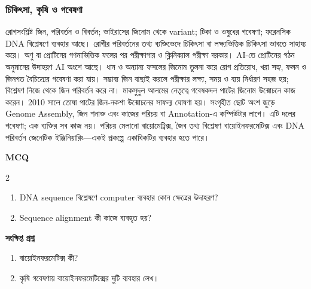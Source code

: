\subsubsection{চিকিৎসা, কৃষি ও গবেষণা}
রোগসংশ্লিষ্ট জিন, পরিবর্তন ও বিবর্তন; ভাইরাসের জিনোম থেকে variant; টিকা ও ওষুধের গবেষণা; ফরেনসিক DNA বিশ্লেষণে ব্যবহার আছে। রোগীর পরিবর্তনের তথ্য ব্যক্তিভেদে চিকিৎসা বা লক্ষ্যভিত্তিক চিকিৎসা ভাবতে সাহায্য করে। অণু বা প্রোটিনের গণনাভিত্তিক ফলের পর পরীক্ষাগার ও ক্লিনিক্যাল পরীক্ষা দরকার। AI-তে প্রোটিনের গঠন অনুমানের উদাহরণ AI অংশে আছে।
ধান ও অন্যান্য ফসলের জিনোম তুলনা করে রোগ প্রতিরোধ, খরা সহ্য, ফলন ও জিনগত বৈচিত্র্যের গবেষণা করা যায়। সম্ভাব্য জিন বাছাই করলে পরীক্ষার লক্ষ্য, সময় ও ব্যয় নির্ধারণ সহজ হয়; বিশ্লেষণ নিজে থেকে জিন পরিবর্তন করে না।
মাকসুদুল আলমের নেতৃত্বে গবেষকদল পাটের জিনোম উন্মোচনে কাজ করেন। 2010 সালে তোষা পাটের জিন-নকশা উন্মোচনের সাফল্য ঘোষণা হয়। সংগৃহীত ছোট অংশ জুড়ে Genome Assembly, জিন শনাক্ত এবং কাজের পরিচয় বা Annotation-এ কম্পিউটার লাগে। এটি দলের গবেষণা; এক ব্যক্তির সব কাজ নয়। পরিচয় মেলানো বায়োমেট্রিক্স, জৈব তথ্য বিশ্লেষণ বায়োইনফরমেটিক্স এবং DNA পরিবর্তন জেনেটিক ইঞ্জিনিয়ারিং---একই প্রকল্পে একাধিকটির ব্যবহার হতে পারে।
\begin{practicebox}
\textbf{MCQ}
\begin{multicols}{2}\begin{enumerate}
\item \begin{minipage}[t]{\linewidth}DNA sequence বিশ্লেষণে computer ব্যবহার কোন ক্ষেত্রের উদাহরণ?\par {}\par\end{minipage}
\item \begin{minipage}[t]{\linewidth}Sequence alignment কী কাজে ব্যবহৃত হয়?\par {}\par\end{minipage}
\end{enumerate}\end{multicols}

\textbf{সংক্ষিপ্ত প্রশ্ন}
\begin{enumerate}
\item বায়োইনফরমেটিক্স কী?
\item কৃষি গবেষণায় বায়োইনফরমেটিক্সের দুটি ব্যবহার লেখ।
\end{enumerate}
\end{practicebox}

